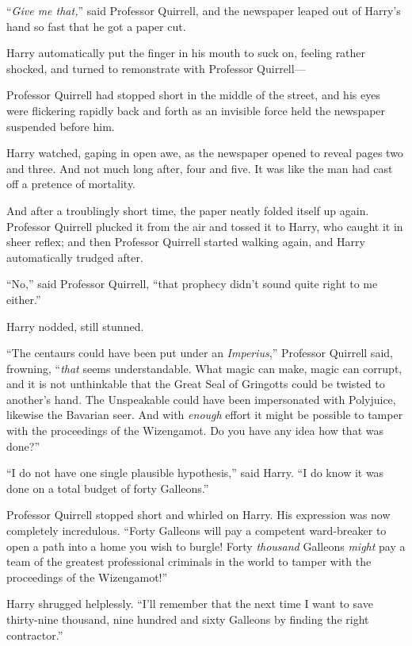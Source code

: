 “\emph{Give me that,}” said Professor Quirrell, and the newspaper leaped out of Harry’s hand so fast that he got a paper cut.

Harry automatically put the finger in his mouth to suck on, feeling rather shocked, and turned to remonstrate with Professor Quirrell—

Professor Quirrell had stopped short in the middle of the street, and his eyes were flickering rapidly back and forth as an invisible force held the newspaper suspended before him.

Harry watched, gaping in open awe, as the newspaper opened to reveal pages two and three. And not much long after, four and five. It was like the man had cast off a pretence of mortality.

And after a troublingly short time, the paper neatly folded itself up again. Professor Quirrell plucked it from the air and tossed it to Harry, who caught it in sheer reflex; and then Professor Quirrell started walking again, and Harry automatically trudged after.

“No,” said Professor Quirrell, “that prophecy didn’t sound quite right to me either.”

Harry nodded, still stunned.

“The centaurs could have been put under an \emph{Imperius},” Professor Quirrell said, frowning, “\emph{that} seems understandable. What magic can make, magic can corrupt, and it is not unthinkable that the Great Seal of Gringotts could be twisted to another’s hand. The Unspeakable could have been impersonated with Polyjuice, likewise the Bavarian seer. And with \emph{enough} effort it might be possible to tamper with the proceedings of the Wizengamot. Do you have any idea how that was done?”

“I do not have one single plausible hypothesis,” said Harry. “I do know it was done on a total budget of forty Galleons.”

Professor Quirrell stopped short and whirled on Harry. His expression was now completely incredulous. “Forty Galleons will pay a competent ward-breaker to open a path into a home you wish to burgle! Forty \emph{thousand} Galleons \emph{might} pay a team of the greatest professional criminals in the world to tamper with the proceedings of the Wizengamot!”

Harry shrugged helplessly. “I’ll remember that the next time I want to save thirty-nine thousand, nine hundred and sixty Galleons by finding the right contractor.”

